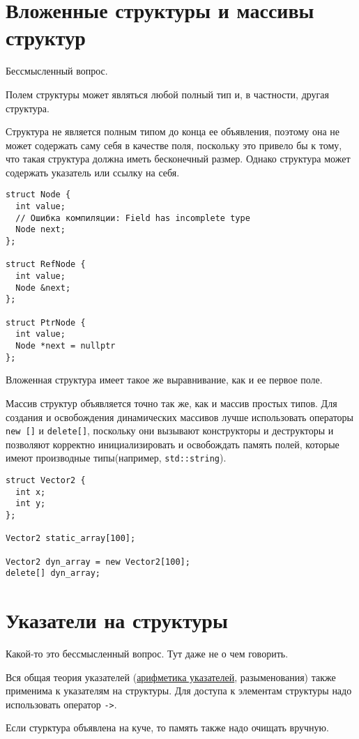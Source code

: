\documentclass[14pt, a4paper]{extarticle}
\begin{document}
\section{Вложенные структуры и массивы структур}
Бессмысленный вопрос.

Полем структуры может являться любой полный тип и, в частности, другая структура.

Структура не является полным типом до конца ее объявления, поэтому она не может
содержать саму себя в качестве поля, поскольку это привело бы к тому, что такая
структура должна иметь бесконечный размер. Однако структура может содержать
указатель или ссылку на себя.

\begin{verbatim}
struct Node {
  int value;
  // Ошибка компиляции: Field has incomplete type
  Node next;
};

struct RefNode {
  int value;
  Node &next;
};

struct PtrNode {
  int value;
  Node *next = nullptr
};
\end{verbatim}

Вложенная структура имеет такое же выравнивание, как и ее первое поле.

Массив структур объявляется точно так же, как и массив простых типов.
Для создания и освобождения динамических массивов лучше использовать
операторы \verb|new []| и \verb|delete[]|, поскольку они вызывают
конструкторы и деструкторы и позволяют корректно инициализировать и
освобождать память полей, которые имеют производные типы(например,
\verb|std::string|).
\begin{verbatim}
struct Vector2 {
  int x;
  int y;
};

Vector2 static_array[100];

Vector2 dyn_array = new Vector2[100];
delete[] dyn_array;
\end{verbatim}

\section{Указатели на структуры}
Какой-то это бессмысленный вопрос. Тут даже не о чем говорить.

Вся общая теория указателей (\hyperref[sec:ptr_arithm]{арифметика указателей}, разыменования) также
применима к указателям на структуры. Для доступа к элементам структуры надо использовать
оператор \verb|->|.

Если стурктура объявлена на куче, то память также надо очищать вручную.
\end{document}
